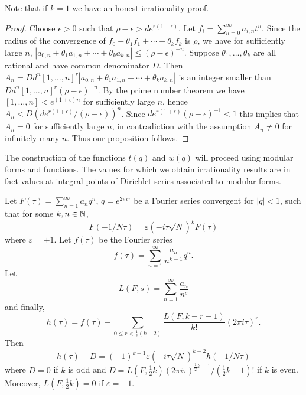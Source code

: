 \begin{remark*}
    Note that if $k = 1$ we have an honest irrationality proof.
\end{remark*}

\begin{proof}
    Choose $\epsilon > 0$ such that $\rho - \epsilon > d e^{r(1 + \epsilon)}$.
    Let $f_i = \sum_{n=0}^{\infty} a_{i,n} t^n$.
    Since the radius of the convergence of $f_0 + \theta_1 f_1 + \cdots + \theta_k f_k$ is $\rho$,
    we have for sufficiently large $n$, $|a_{0,n} + \theta_1 a_{1,n} + \cdots + \theta_k a_{k,n}| \le (\rho - \epsilon)^{-n}$.
    Suppose $\theta_1, \dots, \theta_k$ are all rational and have common denominator $D$.
    Then $A_n = D d^n [1, \dots, n]^r |a_{0,n} + \theta_1 a_{1,n} + \cdots + \theta_k a_{k,n}|$ is an integer smaller than
    $D d^n [1, \dots, n]^r (\rho - \epsilon)^{-n}$.
    By the prime number theorem we have $[1, \dots, n] < e^{(1 + \epsilon)n}$ for sufficiently large $n$,
    hence $A_n < D (d e^{r(1 + \epsilon)} / (\rho - \epsilon))^{n}$.
    Since $d e^{r(1 + \epsilon)}  (\rho - \epsilon)^{-1} < 1$ this implies that $A_n = 0$ for sufficiently large $n$,
    in contradiction with the assumption $A_n \ne 0$ for infinitely many $n$.
    Thus our proposition follows. 
\end{proof}

The construction of the functions $t(q)$ and $w(q)$ will proceed using
modular forms and functions. The values for which we obtain irrationality
results are in fact values at integral points of Dirichlet series
associated to modular forms.

\begin{proposition}
    \label{prop:1.2}
    Let $F(\tau) = \sum_{n=1}^{\infty} a_n q^n$, $q = e^{2 \pi i \tau}$ be a Fourier series
    convergent for $|q| < 1$, such that for some $k, n \in \mathbb{N}$,
    $$
        F(-1/N\tau) = \varepsilon(-i\tau \sqrt{N})^{k} F(\tau)
    $$
    where $\varepsilon = \pm 1$.
    Let $f(\tau)$ be the Fourier series
    $$
        f(\tau) = \sum_{n = 1}^{\infty} \frac{a_n}{n^{k-1}} q^n.
    $$
    Let
    $$
        L(F, s) = \sum_{n=1}^{\infty} \frac{a_n}{n^s}
    $$
    and finally,
    $$
        h(\tau) = f(\tau) - \sum_{0 \le r < \frac{1}{2}(k - 2)} \frac{L(F, k - r - 1)}{k!} (2 \pi i \tau)^r.
    $$
    Then
    $$
        h(\tau) - D = (-1)^{k-1} \varepsilon (-i\tau \sqrt{N})^{k-2} h(-1/N\tau)
    $$
    where $D = 0$ if $k$ is odd and $D = L(F, \frac{1}{2}k) (2 \pi i \tau)^{\frac{1}{2}k - 1} / (\frac{1}{2}k - 1)!$ if $k$ is even.
    Moreover, $L(F, \frac{1}{2}k) = 0$ if $\varepsilon = -1$.
\end{proposition}

